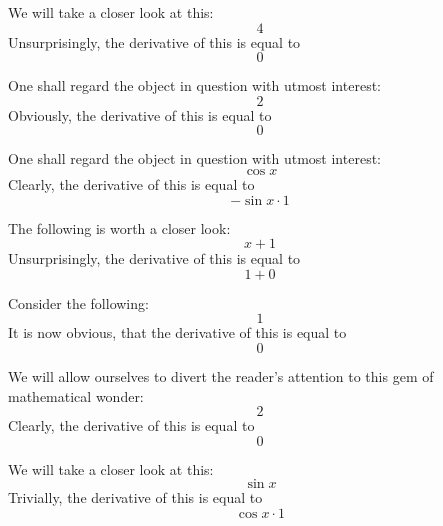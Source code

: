 \documentclass{article}
\begin{document}
We will take a closer look at this:
\begin{equation}
4 
\end{equation}
Unsurprisingly, the derivative of this is equal to
\begin{equation}
0 
\end{equation}

One shall regard the object in question with utmost interest:
\begin{equation}
2 
\end{equation}
Obviously, the derivative of this is equal to
\begin{equation}
0 
\end{equation}

One shall regard the object in question with utmost interest:
\begin{equation}
\cos x 
\end{equation}
Clearly, the derivative of this is equal to
\begin{equation}
-\sin x \cdot 1 
\end{equation}

The following is worth a closer look:
\begin{equation}
x + 1 
\end{equation}
Unsurprisingly, the derivative of this is equal to
\begin{equation}
1 + 0 
\end{equation}

Consider the following:
\begin{equation}
1 
\end{equation}
It is now obvious, that the derivative of this is equal to
\begin{equation}
0 
\end{equation}

We will allow ourselves to divert the reader's attention to this gem of mathematical wonder:
\begin{equation}
2 
\end{equation}
Clearly, the derivative of this is equal to
\begin{equation}
0 
\end{equation}

We will take a closer look at this:
\begin{equation}
\sin x 
\end{equation}
Trivially, the derivative of this is equal to
\begin{equation}
\cos x \cdot 1 
\end{equation}
\end{document}
